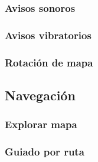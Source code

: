 \subsubsection{Avisos sonoros}
\subsubsection{Avisos vibratorios}
\subsubsection{Rotación de mapa}
\subsection{Navegación}
\subsubsection{Explorar mapa}
\subsubsection{Guiado por ruta}

